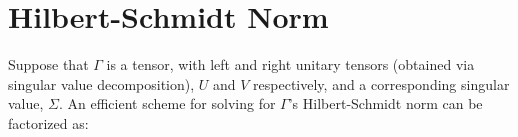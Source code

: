\section{Hilbert-Schmidt Norm}
\label{app:hs}

\noindent Suppose that $\Gamma$ is a tensor, with left and right unitary tensors (obtained via singular value decomposition), $U$ and $V$ respectively, and a corresponding singular value, $\Sigma$. An efficient  scheme for solving for $\Gamma$'s Hilbert-Schmidt norm can be factorized as:
%
